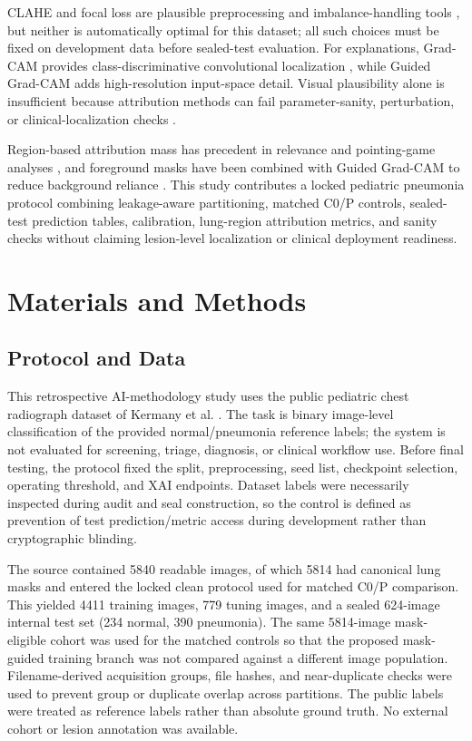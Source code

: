 \documentclass[runningheads]{llncs}
\newcommand{\citep}[1]{\cite{#1}}
\begin{document}
CLAHE and focal loss are plausible preprocessing and imbalance-handling tools
\citep{zuiderveld1994,lin2017}, but neither is automatically optimal for this
dataset; all such choices must be fixed on development data before sealed-test
evaluation. For explanations, Grad-CAM provides class-discriminative convolutional
localization \citep{selvaraju2017}, while Guided Grad-CAM adds high-resolution
input-space detail. Visual plausibility alone is insufficient because attribution
methods can fail parameter-sanity, perturbation, or clinical-localization checks
\citep{samek2017,petsiuk2018,adebayo2018,hedstrom2023,saporta2022}.

Region-based attribution mass has precedent in relevance and pointing-game
analyses \citep{kohlbrenner2020,arras2022,wang2020}, and foreground masks have
been combined with Guided Grad-CAM to reduce background reliance \citep{bassi2024}.
This study contributes a locked pediatric pneumonia protocol combining
leakage-aware partitioning, matched C0/P controls, sealed-test prediction tables,
calibration, lung-region attribution metrics, and sanity checks without claiming
lesion-level localization or clinical deployment readiness.

\section{Materials and Methods}

\subsection{Protocol and Data}

This retrospective AI-methodology study uses the public pediatric chest
radiograph dataset of Kermany et al. \citep{kermany2018}. The task is binary
image-level classification of the provided normal/pneumonia reference labels; the
system is not evaluated for screening, triage, diagnosis, or clinical workflow
use. Before final testing, the protocol fixed the split, preprocessing, seed list,
checkpoint selection, operating threshold, and XAI endpoints. Dataset labels were
necessarily inspected during audit and seal construction, so the control is
defined as prevention of test prediction/metric access during development rather
than cryptographic blinding.

The source contained 5840 readable images, of which 5814 had canonical lung masks
and entered the locked clean protocol used for matched C0/P comparison. This
yielded 4411 training images, 779 tuning images, and a sealed 624-image internal
test set (234 normal, 390 pneumonia). The same 5814-image mask-eligible cohort was
used for the matched controls so that the proposed mask-guided training branch was
not compared against a different image population. Filename-derived acquisition
groups, file hashes, and near-duplicate checks were used to prevent group or
duplicate overlap across partitions. The public labels were treated as reference
labels rather than absolute ground truth. No external cohort or lesion annotation
was available.
\end{document}
